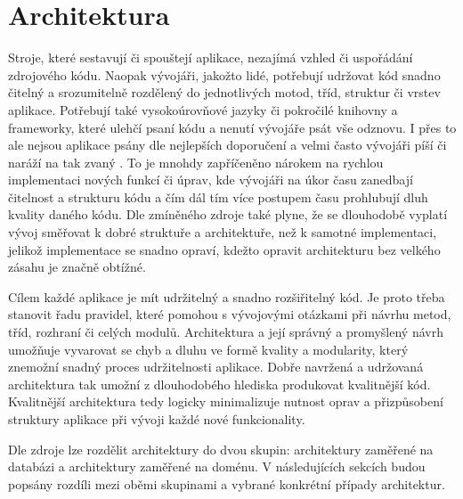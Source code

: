 \section{Architektura}

Stroje,
které sestavují či spouštejí aplikace,
nezajímá vzhled či uspořádání zdrojového kódu.
Naopak vývojáři,
jakožto lidé,
potřebují udržovat kód snadno čitelný a srozumitelně rozdělený do jednotlivých
motod, tříd, struktur či vrstev aplikace.
Potřebují také vysokoúrovňové jazyky či pokročilé knihovny a frameworky,
které ulehčí psaní kódu a nenutí vývojáře psát vše odznovu.
I přes to ale nejsou aplikace psány dle nejlepších doporučení
a velmi často vývojáři píší či naráží na tak zvaný .
To je mnohdy zapříčeněno nárokem na rychlou implementaci nových funkcí či úprav,
kde vývojáři na úkor času zanedbají čitelnost a strukturu kódu
a čím dál tím více postupem času prohlubují dluh kvality daného kódu.
\cite{architecture}
\cite{martin_clean_architecture}
Dle zmíněného zdroje také plyne,
že se dlouhodobě vyplatí vývoj směřovat k dobré struktuře a architektuře,
než k samotné implementaci,
jelikož implementace se snadno opraví,
kdežto opravit architekturu bez velkého zásahu je značně obtížné.
\cite{martin_clean_architecture}

Cílem každé aplikace je mít udržitelný a snadno rozšiřitelný kód.
Je proto třeba stanovit řadu pravidel,
které pomohou s vývojovými otázkami při návrhu metod, tříd, rozhraní či
celých modulů.
Architektura a její správný a promyšlený návrh umožňuje vyvarovat
se chyb a dluhu ve formě kvality a modularity,
který znemožní snadný proces udržitelnosti aplikace.
\cite{martin_clean_architecture}
Dobře navržená a udržovaná architektura tak umožní z dlouhodobého hlediska
produkovat kvalitnější kód.
Kvalitnější architektura tedy logicky minimalizuje nutnost oprav a
přizpůsobení struktury aplikace při vývoji každé nové funkcionality.

Dle zdroje \cite{architecture} lze rozdělit architektury do dvou skupin:
architektury zaměřené na databázi a architektury zaměřené na doménu.
V následujících sekcích budou popsány rozdíli mezi oběmi skupinami
a vybrané konkrétní případy architektur.

